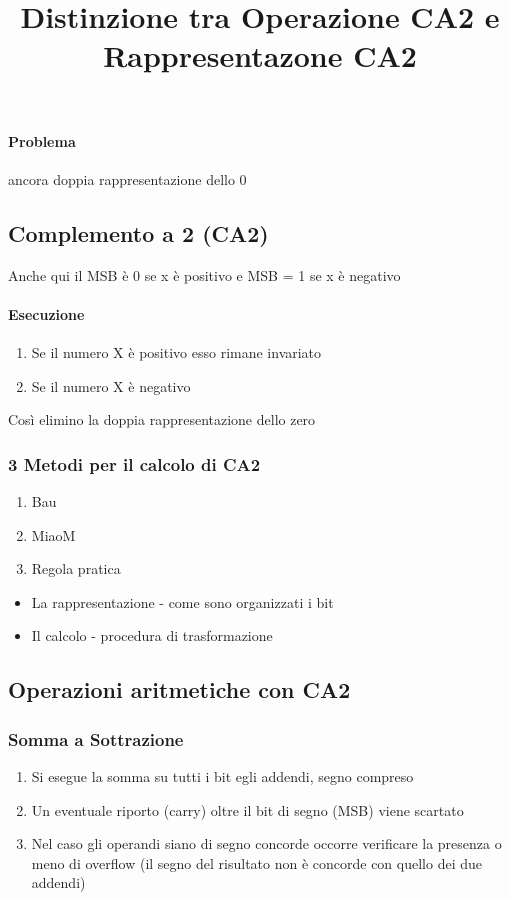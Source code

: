 \documentclass[12pt, a4paper, openany]{book}
\begin{document}
\paragraph{Problema} ancora doppia rappresentazione dello 0

\subsection{Complemento a 2 (CA2)}
Anche qui il MSB è 0 se x è positivo e MSB = 1 se x è negativo
\paragraph{Esecuzione}
\begin{enumerate}
    \item Se il numero X è positivo esso rimane invariato
    \item Se il numero X è negativo 
\end{enumerate}
Così elimino la doppia rappresentazione dello zero

\subsubsection{3 Metodi per il calcolo di CA2}
\begin{enumerate}
    \item Bau
    \item MiaoM
    \item Regola pratica
\end{enumerate}

\title{Distinzione tra Operazione CA2 e Rappresentazone CA2}
\begin{itemize}
    \item La rappresentazione - come sono organizzati i bit
    \item Il calcolo - procedura di trasformazione
\end{itemize}

\subsection{Operazioni aritmetiche con CA2}
\subsubsection{Somma a Sottrazione}
\begin{enumerate}
    \item Si esegue la somma su tutti i bit egli addendi, segno compreso
    \item Un eventuale riporto (carry) oltre il bit di segno (MSB) viene scartato
    \item Nel caso gli operandi siano di segno concorde occorre verificare la presenza o meno di overflow (il segno del risultato non  è concorde
    con quello dei due addendi)
\end{enumerate}
\end{document}
